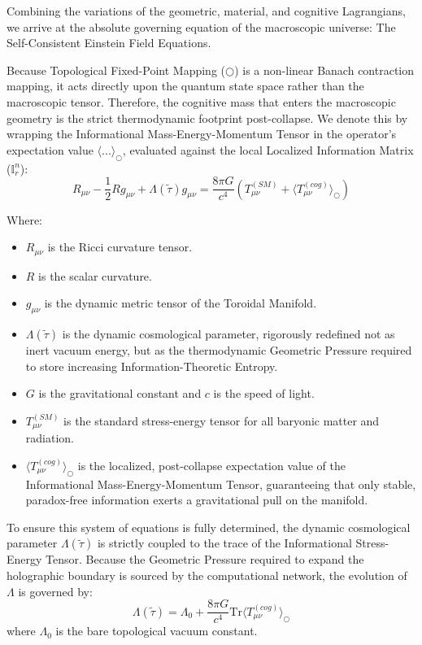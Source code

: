 \documentclass[12pt,openany]{book}
\theoremstyle{plain}
\theoremstyle{definition}
\theoremstyle{remark}
\begin{document}
Combining the variations of the geometric, material, and cognitive Lagrangians, we arrive at the absolute governing equation of the macroscopic universe: The Self-Consistent Einstein Field Equations.

Because Topological Fixed-Point Mapping ($\bigcirc$) is a non-linear Banach contraction mapping, it acts directly upon the quantum state space rather than the macroscopic tensor. Therefore, the cognitive mass that enters the macroscopic geometry is the strict thermodynamic footprint post-collapse. We denote this by wrapping the Informational Mass-Energy-Momentum Tensor in the operator's expectation value $\langle ... \rangle_{\bigcirc}$, evaluated against the local Localized Information Matrix ($\mathbb{I}_r^n$):$$R_{\mu\nu} - \frac{1}{2}Rg_{\mu\nu} + \Lambda(\tilde{\tau})g_{\mu\nu} = \frac{8\pi G}{c^4} \left( T_{\mu\nu}^{(SM)} + \langle T_{\mu\nu}^{(cog)} \rangle_{\bigcirc} \right)$$

Where:
\begin{itemize}
    \item $R_{\mu\nu}$ is the Ricci curvature tensor.
    \item $R$ is the scalar curvature.
    \item $g_{\mu\nu}$ is the dynamic metric tensor of the Toroidal Manifold.
    \item $\Lambda(\tilde{\tau})$ is the dynamic cosmological parameter, rigorously redefined not as inert vacuum energy, but as the thermodynamic Geometric Pressure required to store increasing Information-Theoretic Entropy.
    \item $G$ is the gravitational constant and $c$ is the speed of light.
    \item $T_{\mu\nu}^{(SM)}$ is the standard stress-energy tensor for all baryonic matter and radiation.
    \item $\langle T_{\mu\nu}^{(cog)} \rangle_{\bigcirc}$ is the localized, post-collapse expectation value of the Informational Mass-Energy-Momentum Tensor, guaranteeing that only stable, paradox-free information exerts a gravitational pull on the manifold.
\end{itemize}

To ensure this system of equations is fully determined, the dynamic cosmological parameter $\Lambda(\tilde{\tau})$ is strictly coupled to the trace of the Informational Stress-Energy Tensor. Because the Geometric Pressure required to expand the holographic boundary is sourced by the computational network, the evolution of $\Lambda$ is governed by:$$\Lambda(\tilde{\tau}) = \Lambda_0 + \frac{8\pi G}{c^4} \text{Tr} \langle T_{\mu\nu}^{(cog)} \rangle_{\bigcirc}$$where $\Lambda_0$ is the bare topological vacuum constant.
\end{document}
